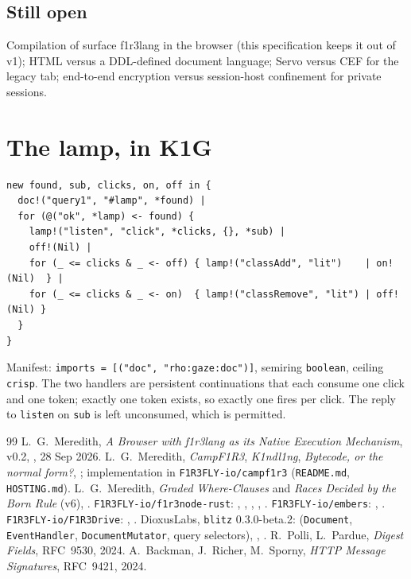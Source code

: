 \documentclass[11pt]{article}
\theoremstyle{definition}
\theoremstyle{remark}
\newcommand{\fl}{f1r3lang}
\newcommand{\code}[1]{\texttt{#1}}
\begin{document}
\subsection{Still open}
Compilation of surface \fl{} in the browser (this specification keeps it out of v1);
HTML versus a DDL-defined document language; Servo versus CEF for the legacy tab;
end-to-end encryption versus session-host confinement for private sessions.

\appendix
\section{The lamp, in K1G}\label{app:lamp}
\begin{lstlisting}
new found, sub, clicks, on, off in {
  doc!("query1", "#lamp", *found) |
  for (@("ok", *lamp) <- found) {
    lamp!("listen", "click", *clicks, {}, *sub) |
    off!(Nil) |
    for (_ <= clicks & _ <- off) { lamp!("classAdd", "lit")    | on!(Nil)  } |
    for (_ <= clicks & _ <- on)  { lamp!("classRemove", "lit") | off!(Nil) }
  }
}
\end{lstlisting}
\noindent
Manifest: \code{imports = [("doc", "rho:gaze:doc")]}, semiring \code{boolean},
ceiling \code{crisp}. The two handlers are persistent continuations that each consume
one click and one token; exactly one token exists, so exactly one fires per click.
The reply to \code{listen} on \code{sub} is left unconsumed, which is permitted.

\begin{thebibliography}{99}\small
{} L.~G.~Meredith, \emph{A Browser with f1r3lang as its Native Execution
  Mechanism}, v0.2, , 28 Sep 2026.
 L.~G.~Meredith, \emph{CampF1R3}, \emph{K1ndl1ng}, \emph{Bytecode, or the
  normal form?}, ; implementation in \code{F1R3FLY-io/campf1r3}
  (\code{README.md}, \code{HOSTING.md}).
 L.~G.~Meredith, \emph{Graded Where-Clauses} and \emph{Races Decided by the
  Born Rule} (v6), .
 \code{F1R3FLY-io/f1r3node-rust}: ,
  ,
  , ,
  .
 \code{F1R3FLY-io/embers}: ,
  .
 \code{F1R3FLY-io/F1R3Drive}: ,
  .
 DioxusLabs, \code{blitz} 0.3.0-beta.2: 
  (\code{Document}, \code{EventHandler}, \code{DocumentMutator}, query selectors),
  , .
 R.~Polli, L.~Pardue, \emph{Digest Fields}, RFC~9530, 2024.
 A.~Backman, J.~Richer, M.~Sporny, \emph{HTTP Message Signatures},
  RFC~9421, 2024.
\end{thebibliography}
\end{document}
